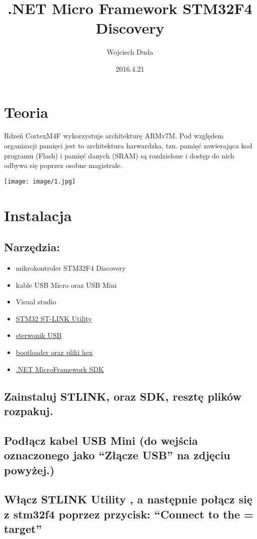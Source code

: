 ﻿\documentclass{article}
\title{.NET Micro Framework
STM32F4 Discovery}
\date{2016.4.21}
\author{Wojciech Duda}
\begin{document}
 
\maketitle 
{} 
\newpage
{}
\section{Teoria}
Rdzeń CortexM4F wykorzystuje architekturę ARMv7M. Pod względem organizacji pamięci jest to architektura harwardzka, tzn. pamięć zawierająca kod programu (Flash) i pamięć danych (SRAM) są rozdzielone i dostęp do nich odbywa się poprzez osobne magistrale.

\texttt{[image: image/1.jpg]}
\section{Instalacja}
\subsection{Narzędzia:}
\begin{itemize}
\item mikrokontroler STM32F4 Discovery
\item kable USB Micro oraz USB Mini
\item Visual studio
\item \href{http://www.st.com/content/st_com/en/products/embedded-software/development-tool-software/stsw-link004.html}{STM32 ST-LINK Utility}
\item \href{www.codeplex.com/Download?ProjectName=netmf4stm32&DownloadId=471395}{sterwonik USB}
\item \href{www.codeplex.com/Download?ProjectName=netmf4stm32&DownloadId=471396}{bootloader oraz pliki hex}
\item \href {netmf.codeplex.com/releases/view/91594}{.NET MicroFramework SDK}
\end{itemize}
\subsection{Zainstaluj STLINK, oraz SDK, resztę plików rozpakuj.}
\subsection{Podłącz kabel USB Mini (do wejścia oznaczonego jako “Złącze USB” na zdjęciu powyżej.)}
\subsection{Włącz STLINK Utility , a następnie połącz się z stm32f4 poprzez przycisk: “Connect to the = target”}
\end{document}
